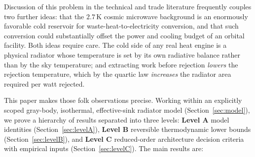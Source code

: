 \documentclass[11pt]{article}
\theoremstyle{definition}
\theoremstyle{remark}
\begin{document}
Discussion of this problem in the technical and trade literature frequently couples two further ideas: that the $2.7\,$K cosmic microwave background is an enormously favorable cold reservoir for waste-heat-to-electricity conversion, and that such conversion could substantially offset the power and cooling budget of an orbital facility. Both ideas require care. The cold side of any real heat engine is a physical radiator whose temperature is set by its own radiative balance rather than by the sky temperature; and extracting work before rejection \emph{lowers} the rejection temperature, which by the quartic law \emph{increases} the radiator area required per watt rejected.

This paper makes those folk observations precise. Working within an explicitly scoped gray-body, isothermal, effective-sink radiator model (Section~\ref{sec:model}), we prove a hierarchy of results separated into three levels: \textbf{Level A} model identities (Section~\ref{sec:levelA}), \textbf{Level B} reversible thermodynamic lower bounds (Section~\ref{sec:levelB}), and \textbf{Level C} reduced-order architecture decision criteria with empirical inputs (Section~\ref{sec:levelC}). The main results are:
\end{document}
